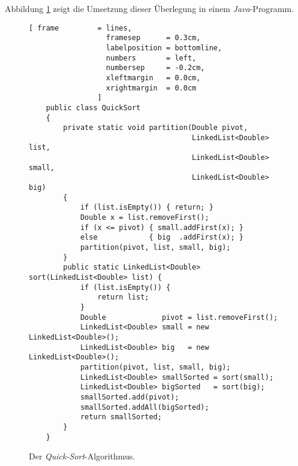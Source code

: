Abbildung \ref{fig:quick-sort} zeigt die Umsetzung dieser Überlegung 
in einem \textsl{Java}-Programm.

\begin{figure}[!ht]
  \centering
\begin{Verbatim}[ frame         = lines, 
                  framesep      = 0.3cm, 
                  labelposition = bottomline,
                  numbers       = left,
                  numbersep     = -0.2cm,
                  xleftmargin   = 0.0cm,
                  xrightmargin  = 0.0cm
                ]
    public class QuickSort
    {  
        private static void partition(Double pivot, 
                                      LinkedList<Double> list,
                                      LinkedList<Double> small, 
                                      LinkedList<Double> big) 
        {
            if (list.isEmpty()) { return; }
            Double x = list.removeFirst();
            if (x <= pivot) { small.addFirst(x); } 
            else            { big  .addFirst(x); }
            partition(pivot, list, small, big);
        }
        public static LinkedList<Double> sort(LinkedList<Double> list) {
            if (list.isEmpty()) {
                return list;
            }
            Double             pivot = list.removeFirst();
            LinkedList<Double> small = new LinkedList<Double>();
            LinkedList<Double> big   = new LinkedList<Double>();
            partition(pivot, list, small, big);
            LinkedList<Double> smallSorted = sort(small);
            LinkedList<Double> bigSorted   = sort(big);
            smallSorted.add(pivot);
            smallSorted.addAll(bigSorted);
            return smallSorted;
        }    
    }
\end{Verbatim}
\vspace*{-0.3cm}
  \caption{Der \emph{Quick-Sort}-Algorithmus.}
  \label{fig:quick-sort}
\end{figure}

